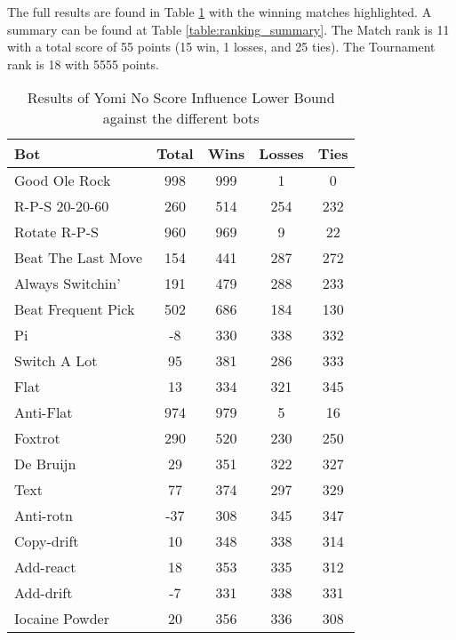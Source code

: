 The full results are found in Table \ref{table:Yomi_NoScoreInfluence_LowerBound_results} with the winning matches highlighted. A summary can be found at Table \ref{table:ranking_summary}. The Match rank is 11 with a total score of 55 points (15 win, 1 losses, and 25 ties). The Tournament rank is 18 with 5555 points.

\begin{table}
    \caption{Results of Yomi No Score Influence Lower Bound against the different bots}
    \label{table:Yomi_NoScoreInfluence_LowerBound_results}
    \centering
    \begin{tabular}{|l|c|c|c|c|}
        \hline
        \textbf{Bot} & \textbf{Total} & \textbf{Wins} & \textbf{Losses} & \textbf{Ties} \\ \hline
\rowcolor{HighlightRowColor} Good Ole Rock & 998 & 999 & 1 & 0 \\ \hline 
\rowcolor{HighlightRowColor} R-P-S 20-20-60 & 260 & 514 & 254 & 232 \\ \hline 
\rowcolor{HighlightRowColor} Rotate R-P-S & 960 & 969 & 9 & 22 \\ \hline 
\rowcolor{HighlightRowColor} Beat The Last Move & 154 & 441 & 287 & 272 \\ \hline 
\rowcolor{HighlightRowColor} Always Switchin' & 191 & 479 & 288 & 233 \\ \hline 
\rowcolor{HighlightRowColor} Beat Frequent Pick & 502 & 686 & 184 & 130 \\ \hline 
Pi & -8 & 330 & 338 & 332 \\ \hline 
\rowcolor{HighlightRowColor} Switch A Lot & 95 & 381 & 286 & 333 \\ \hline 
Flat & 13 & 334 & 321 & 345 \\ \hline 
\rowcolor{HighlightRowColor} Anti-Flat & 974 & 979 & 5 & 16 \\ \hline 
\rowcolor{HighlightRowColor} Foxtrot & 290 & 520 & 230 & 250 \\ \hline 
De Bruijn & 29 & 351 & 322 & 327 \\ \hline 
\rowcolor{HighlightRowColor} Text & 77 & 374 & 297 & 329 \\ \hline 
Anti-rotn & -37 & 308 & 345 & 347 \\ \hline 
Copy-drift & 10 & 348 & 338 & 314 \\ \hline 
Add-react & 18 & 353 & 335 & 312 \\ \hline 
Add-drift & -7 & 331 & 338 & 331 \\ \hline 
Iocaine Powder & 20 & 356 & 336 & 308 \\ \hline 

\end{tabular}
\end{table}
